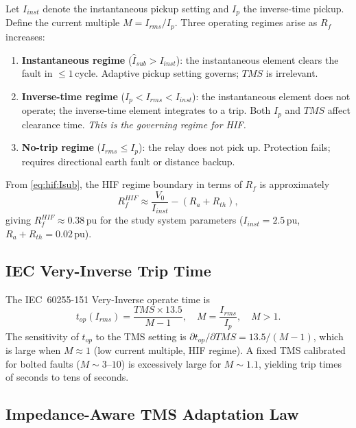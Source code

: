 \documentclass[12pt,a4paper]{article}
\theoremstyle{definition}
\theoremstyle{plain}
\newcommand{\pu}{\,\text{pu}}
\begin{document}
Let $I_{inst}$ denote the instantaneous pickup setting and $I_p$ the
inverse-time pickup.  Define the current multiple $M = I_{rms}/I_p$.
Three operating regimes arise as $R_f$ increases:

\begin{enumerate}
  \item \textbf{Instantaneous regime} ($\hat{I}_{sub} > I_{inst}$):
        the instantaneous element clears the fault in $\leq 1$\,cycle.
        Adaptive pickup setting governs; $TMS$ is irrelevant.
  \item \textbf{Inverse-time regime} ($I_p < I_{rms} < I_{inst}$):
        the instantaneous element does not operate; the inverse-time element
        integrates to a trip.  Both $I_p$ and $TMS$ affect clearance time.
        \emph{This is the governing regime for HIF.}
  \item \textbf{No-trip regime} ($I_{rms} \leq I_p$):
        the relay does not pick up.  Protection fails; requires
        directional earth fault or distance backup.
\end{enumerate}

From \cref{eq:hif:Isub}, the HIF regime boundary in terms of $R_f$ is
approximately
\begin{equation}
  R_f^{HIF} \approx \frac{V_0}{I_{inst}} - \left(R_a + R_{th}\right),
  \label{eq:hif:boundary}
\end{equation}
giving $R_f^{HIF} \approx 0.38\pu$ for the study system parameters
($I_{inst} = 2.5\pu$, $R_a + R_{th} = 0.02\pu$).

\subsection{IEC Very-Inverse Trip Time}
\label{sec:hif:iectime}

The IEC~60255-151 Very-Inverse operate time is \citep{IEC60255-151}
\begin{equation}
  t_{op}(I_{rms}) = \frac{TMS \times 13.5}{M - 1},
  \quad M = \frac{I_{rms}}{I_p},\quad M > 1.
  \label{eq:hif:top}
\end{equation}
The sensitivity of $t_{op}$ to the TMS setting is
$\partial t_{op}/\partial TMS = 13.5/(M-1)$, which is large when
$M \approx 1$ (low current multiple, HIF regime).  A fixed TMS calibrated
for bolted faults ($M \sim 3$--$10$) is excessively large for $M \sim 1.1$,
yielding trip times of seconds to tens of seconds.

\subsection{Impedance-Aware TMS Adaptation Law}
\label{sec:hif:law}
\end{document}
